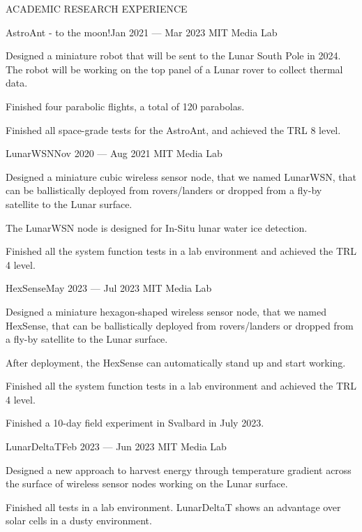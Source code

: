 \documentclass{resume} %
\begin{document}
\begin{rSection}{ACADEMIC RESEARCH EXPERIENCE}
\begin{rSubsection}{AstroAnt - to the moon!}{Jan 2021 --- Mar 2023}{ }{MIT Media Lab}
\item Designed a miniature robot that will be sent to the Lunar South Pole in 2024. The robot will be working on the top panel of a Lunar rover to collect thermal data.
\item Finished four parabolic flights, a total of 120 parabolas.
\item Finished all space-grade tests for the AstroAnt, and achieved the TRL 8 level.
\end{rSubsection}

\begin{rSubsection}{LunarWSN}{Nov 2020 --- Aug 2021}{ }{MIT Media Lab}
\item Designed a miniature cubic wireless sensor node, that we named LunarWSN, that can be ballistically deployed from rovers/landers or dropped from a fly-by satellite to the Lunar surface.
\item The LunarWSN node is designed for In-Situ lunar water ice detection.
\item Finished all the system function tests in a lab environment and achieved the TRL 4 level.
\end{rSubsection}

\newpage

\begin{rSubsection}{HexSense}{May 2023 --- Jul 2023}{ }{MIT Media Lab}
\item Designed a miniature hexagon-shaped wireless sensor node, that we named HexSense, that can be ballistically deployed from rovers/landers or dropped from a fly-by satellite to the Lunar surface.
\item After deployment, the HexSense can automatically stand up and start working.
\item Finished all the system function tests in a lab environment and achieved the TRL 4 level.
\item Finished a 10-day field experiment in Svalbard in July 2023.
\end{rSubsection}

\begin{rSubsection}{LunarDeltaT}{Feb 2023 --- Jun 2023}{ }{MIT Media Lab}
\item Designed a new approach to harvest energy through temperature gradient across the surface of wireless sensor nodes working on the Lunar surface.
\item Finished all tests in a lab environment. LunarDeltaT shows an advantage over solar cells in a dusty environment.
\end{rSubsection}


\end{rSection}
\end{document}
